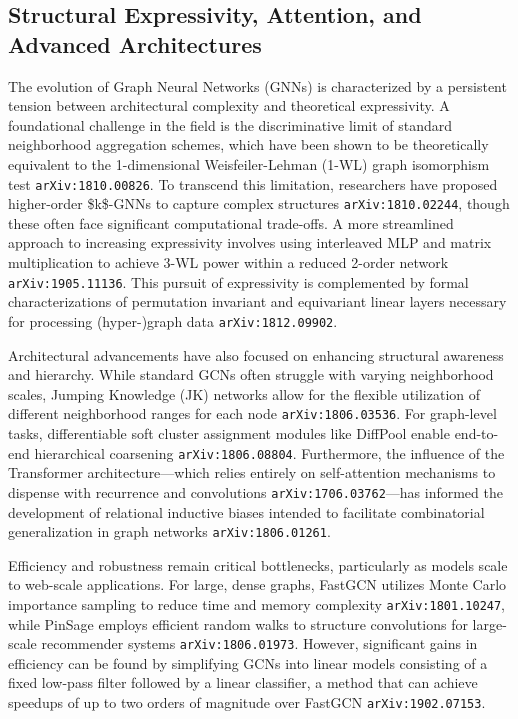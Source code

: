 \documentclass[11pt]{article}
\begin{document}
\subsection{Structural Expressivity, Attention, and Advanced Architectures}

The evolution of Graph Neural Networks (GNNs) is characterized by a persistent tension between architectural complexity and theoretical expressivity. A foundational challenge in the field is the discriminative limit of standard neighborhood aggregation schemes, which have been shown to be theoretically equivalent to the 1-dimensional Weisfeiler-Lehman (1-WL) graph isomorphism test \texttt{arXiv:1810.00826}. To transcend this limitation, researchers have proposed higher-order \$k\$-GNNs to capture complex structures \texttt{arXiv:1810.02244}, though these often face significant computational trade-offs. A more streamlined approach to increasing expressivity involves using interleaved MLP and matrix multiplication to achieve 3-WL power within a reduced 2-order network \texttt{arXiv:1905.11136}. This pursuit of expressivity is complemented by formal characterizations of permutation invariant and equivariant linear layers necessary for processing (hyper-)graph data \texttt{arXiv:1812.09902}.

Architectural advancements have also focused on enhancing structural awareness and hierarchy. While standard GCNs often struggle with varying neighborhood scales, Jumping Knowledge (JK) networks allow for the flexible utilization of different neighborhood ranges for each node \texttt{arXiv:1806.03536}. For graph-level tasks, differentiable soft cluster assignment modules like DiffPool enable end-to-end hierarchical coarsening \texttt{arXiv:1806.08804}. Furthermore, the influence of the Transformer architecture—which relies entirely on self-attention mechanisms to dispense with recurrence and convolutions \texttt{arXiv:1706.03762}—has informed the development of relational inductive biases intended to facilitate combinatorial generalization in graph networks \texttt{arXiv:1806.01261}.

Efficiency and robustness remain critical bottlenecks, particularly as models scale to web-scale applications. For large, dense graphs, FastGCN utilizes Monte Carlo importance sampling to reduce time and memory complexity \texttt{arXiv:1801.10247}, while PinSage employs efficient random walks to structure convolutions for large-scale recommender systems \texttt{arXiv:1806.01973}. However, significant gains in efficiency can be found by simplifying GCNs into linear models consisting of a fixed low-pass filter followed by a linear classifier, a method that can achieve speedups of up to two orders of magnitude over FastGCN \texttt{arXiv:1902.07153}.
\end{document}
